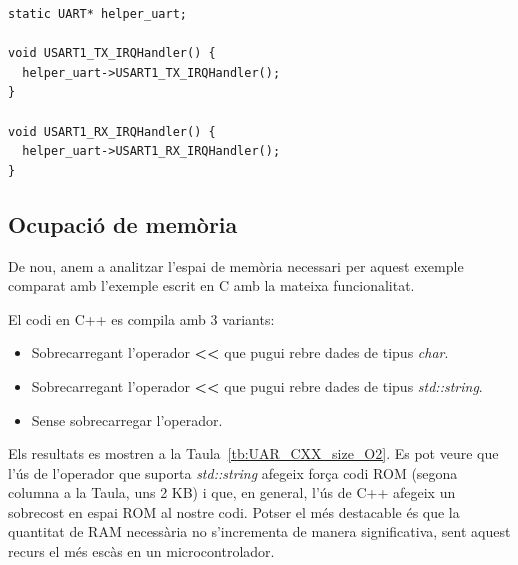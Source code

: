 \begin{lstlisting}[style=customc,caption=Part del fitxer UART.cpp de l'exemple d'us del {\em driver} en C++ per la UART,label=main_ISR_UARTCXX]
static UART* helper_uart;

void USART1_TX_IRQHandler() {
  helper_uart->USART1_TX_IRQHandler();
}

void USART1_RX_IRQHandler() {
  helper_uart->USART1_RX_IRQHandler();
}
\end{lstlisting}

\subsection{Ocupació de memòria}
De nou, anem a analitzar l'espai de memòria necessari per aquest exemple comparat amb l'exemple escrit en C amb la mateixa funcionalitat.

El codi en C++ es compila amb 3 variants:
\begin{itemize}
 \item Sobrecarregant l'operador {\bf <{}<} que pugui rebre dades de tipus {\em char}.
 \item Sobrecarregant l'operador {\bf <{}<} que pugui rebre dades de tipus {\em std::string}.
 \item Sense sobrecarregar l'operador.
\end{itemize}

Els resultats es mostren a la Taula~\ref{tb:UAR_CXX_size_O2}. Es pot veure que l'ús de l'operador que suporta {\em std::string} afegeix força codi ROM (segona columna a la Taula, uns 2 KB) i que, en general, l'ús de C++ afegeix un sobrecost en espai ROM al nostre codi. Potser el més destacable és que la quantitat de RAM necessària no s'incrementa de manera significativa, sent aquest recurs el més escàs en un microcontrolador.


